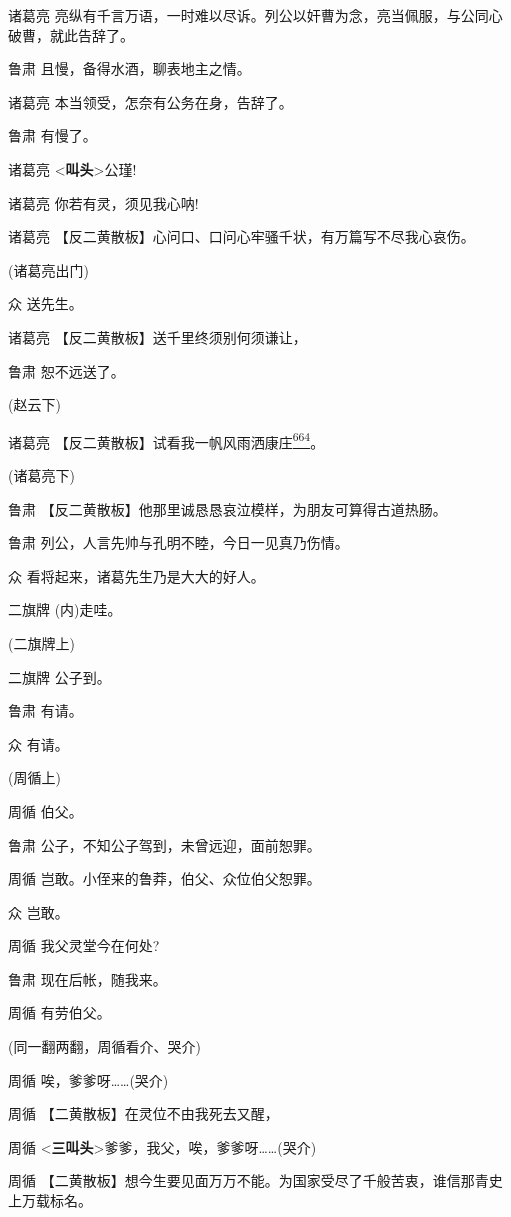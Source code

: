 诸葛亮
亮纵有千言万语，一时难以尽诉。列公以奸曹为念，亮当佩服，与公同心破曹，就此告辞了。

鲁肃 且慢，备得水酒，聊表地主之情。

诸葛亮 本当领受，怎奈有公务在身，告辞了。

鲁肃 有慢了。

诸葛亮 \textless{}\textbf{叫头}\textgreater{}公瑾!

诸葛亮 你若有灵，须见我心呐!

诸葛亮 【反二黄散板】心问口、口问心牢骚千状，有万篇写不尽我心哀伤。

(诸葛亮出门)

众 送先生。

诸葛亮 【反二黄散板】送千里终须别何须谦让，

鲁肃 恕不远送了。

(赵云下)

诸葛亮
【反二黄散板】试看我一帆风雨洒康庄\protect\hyperlink{fn664}{\textsuperscript{664}}。

(诸葛亮下)

鲁肃 【反二黄散板】他那里诚恳恳哀泣模样，为朋友可算得古道热肠。

鲁肃 列公，人言先帅与孔明不睦，今日一见真乃伤情。

众 看将起来，诸葛先生乃是大大的好人。

二旗牌 (内)走哇。

(二旗牌上)

二旗牌 公子到。

鲁肃 有请。

众 有请。

(周循上)

周循 伯父。

鲁肃 公子，不知公子驾到，未曾远迎，面前恕罪。

周循 岂敢。小侄来的鲁莽，伯父、众位伯父恕罪。

众 岂敢。

周循 我父灵堂今在何处?

鲁肃 现在后帐，随我来。

周循 有劳伯父。

(同一翻两翻，周循看介、哭介)

周循 唉，爹爹呀\ldots{}\ldots{}(哭介)

周循 【二黄散板】在灵位不由我死去又醒，

周循
\textless{}\textbf{三叫头}\textgreater{}爹爹，我父，唉，爹爹呀\ldots{}\ldots{}(哭介)

周循
【二黄散板】想今生要见面万万不能。为国家受尽了千般苦衷，谁信那青史上万载标名。

